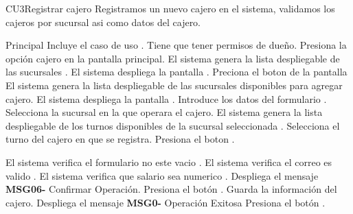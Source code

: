 \begin{UseCase}{CU3}{Registrar cajero}{
		Registramos un nuevo cajero en el sistema, validamos los cajeros por sucursal asi como datos del cajero. 	
	}
\end{UseCase}
\begin{UCtrayectoria}{Principal}
	\UCpaso Incluye el caso de uso .
	\UCpaso [\UCactor] Tiene que tener permisos de dueño.
	\UCpaso [\UCactor] Presiona la opción cajero en la pantalla principal.
	\UCpaso El sistema genera la lista despliegable de las sucursales .
	\UCpaso El sistema despliega la pantalla .
	\UCpaso [\UCactor]Preciona el boton   de la pantalla 
	\UCpaso El sistema genera la lista despliegable de las sucursales disponibles para agregar cajero.
	\UCpaso El sistema despliega la pantalla .
	\UCpaso [\UCactor] Introduce los datos del formulario  .
	\UCpaso [\UCactor] Selecciona la sucursal en la que operara el cajero.
	\UCpaso El sistema genera la lista despliegable de los  turnos disponibles de la sucursal seleccionada .
	\UCpaso [\UCactor] Selecciona el turno del cajero en que se registra.
	\UCpaso [\UCactor]Presiona el boton  .
	
	\UCpaso El sistema verifica el formulario no este vacio .
	\UCpaso	El sistema verifica el correo es valido .
	\UCpaso El sistema verifica que salario sea numerico .%
	\UCpaso Despliega el mensaje {\bf MSG06-} {Confirmar Operación}. 
	\UCpaso [\UCactor] Presiona el botón  .
	\UCpaso Guarda la información del cajero.
	\UCpaso Despliega el mensaje {\bf MSG0-} {Operación Exitosa}
	\UCpaso [\UCactor] Presiona el botón .
	
	
	
\end{UCtrayectoria}

